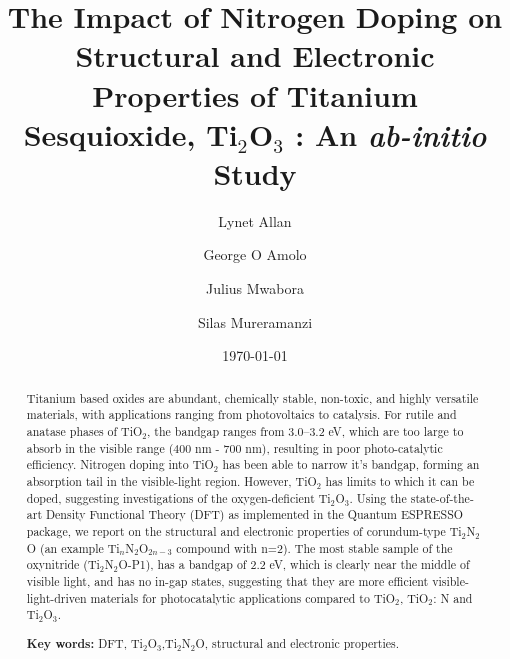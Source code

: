 \documentclass[aps,prb,superscriptaddress,twocolumn,floatfix,showpacs,amsmath]{revtex4-1}
\begin{document}
\begin{titlepage}
\title {The Impact of Nitrogen Doping on Structural and Electronic Properties of Titanium Sesquioxide, Ti$_{2}$O$_{3}$ : An \textit{ab-initio} Study}

\author{Lynet Allan}


\author{George O Amolo}


 
\author{Julius Mwabora}

\author{ Silas Mureramanzi}

\date{\today}

\begin{abstract}

Titanium based oxides are abundant, chemically stable, non-toxic, and highly versatile materials, with applications ranging from photovoltaics to catalysis. For rutile and anatase phases of TiO$_{2}$, the bandgap ranges from 3.0–3.2 eV, which are too large to absorb in the visible range (400 nm - 700 nm), resulting in poor photo-catalytic efficiency. Nitrogen doping into TiO$_{2}$ has been able to narrow it's  bandgap, forming an absorption tail in the visible-light region. However, TiO$_{2}$ has limits to which it can be doped, suggesting investigations of the oxygen-deficient Ti$_{2}$O$_{3}$. Using the state-of-the-art Density Functional Theory (DFT) as implemented in the Quantum ESPRESSO package, we report on the structural and electronic properties of corundum-type Ti$_{2}$N$_{2}$O (an example Ti$_{n}$N$_{2}$O$_{2n-3}$ compound with n=2). The most stable sample of the oxynitride (Ti$_2$N$_2$O-P1), has a bandgap of 2.2 eV, which is clearly near the middle of visible light, and has no in-gap states, suggesting that they are more efficient visible-light-driven materials for photocatalytic applications compared to TiO$_{2}$, TiO$_{2}$: N and Ti$_{2}$O$_{3}$.

%
\textbf{Key words: }DFT, Ti$_{2}$O$_{3}$,Ti$_{2}$N$_{2}$O, structural and electronic properties.
\end{abstract}

\maketitle

\end{titlepage}
\end{document}
